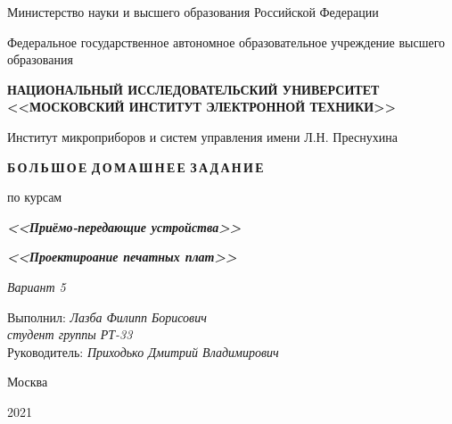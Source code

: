 \thispagestyle{empty}
\setcounter{page}{0}

\begin{center}
    Министерство науки  и высшего образования Российской Федерации

    \vspace{1ex}

    Федеральное государственное автономное образовательное учреждение высшего образования

    \textbf{НАЦИОНАЛЬНЫЙ ИССЛЕДОВАТЕЛЬСКИЙ УНИВЕРСИТЕТ <<МОСКОВСКИЙ ИНСТИТУТ ЭЛЕКТРОННОЙ ТЕХНИКИ>>}

    \vspace{1ex}

    Институт микроприборов и систем управления имени Л.Н. Преснухина
\end{center}

\vspace{13ex}

\begin{center}
    \textbf{Б\,О\,Л\,Ь\,Ш\,О\,Е Д\,О\,М\,А\,Ш\,Н\,Е\,Е З\,А\,Д\,А\,Н\,И\,Е}
    \vspace{1ex}

    по курсам

    \textbf{\textit{<<Приёмо-передающие устройства>>}}
    
    \textbf{\textit{<<Проектироание печатных плат>>}}
    
    \textit{Вариант 5}

\end{center}

\vspace{20ex}

\begin{flushright}
    \noindent
    Выполнил: \textit{Лазба Филипп Борисович} \\
    \textit{студент группы РТ-33} \\
    Руководитель: \textit{Приходько Дмитрий Владимирович}
\end{flushright}

\vfill

\begin{center}
    Москва

    2021
\end{center}

\newpage
